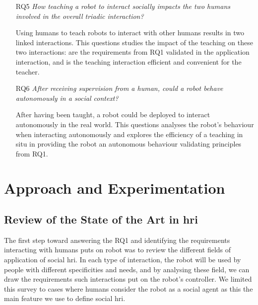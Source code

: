 \begin{itemize}
	\item [RQ5] \emph{How teaching a robot to interact socially impacts the two humans involved in the overall triadic interaction?}
	
		Using humans to teach robots to interact with other humans results in two linked interactions. This questions studies the impact of the teaching on these two interactions: are the requirements from RQ1 validated in the application interaction, and is the teaching interaction efficient and convenient for the teacher.
		
    \item [RQ6] \emph{After receiving supervision from a human, could a robot behave autonomously in a social context?}

	 	After having been taught, a robot could be deployed to interact autonomously in the real world. This questions analyses the robot's behaviour when interacting autonomously and explores the efficiency of a teaching in situ in providing the robot an autonomous behaviour validating principles from RQ1.
	 
\end{itemize}

\section{Approach and Experimentation}

\subsection{Review of the State of the Art in \gls{hri}}
The first step toward answering the RQ1 and identifying the requirements interacting with humans puts on robot was to review the different fields of application of social \gls{hri}. In each type of interaction, the robot will be used by people with different specificities and needs, and by analysing these field, we can draw the requirements such interactions put on the robot's controller. We limited this survey to cases where humans consider the robot as a social agent as this the main feature we use to define social \gls{hri}.

